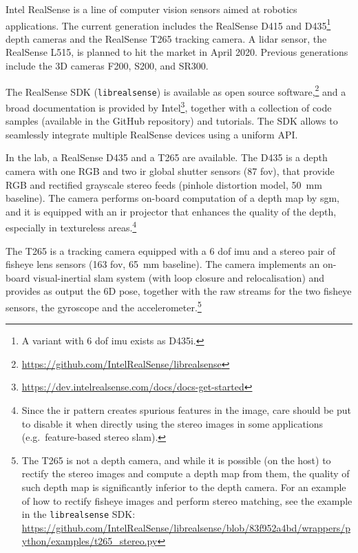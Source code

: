 \documentclass[11pt, letterpaper, twoside]{article}
\begin{document}
Intel RealSense is a line of computer vision sensors aimed at robotics
applications. The current generation includes the RealSense D415 and
D435\footnote{A variant with 6 \gls{dof} \gls{imu} exists as D435i.} depth
cameras and the RealSense T265 tracking camera. A lidar sensor, the RealSense
L515, is planned to hit the market in April 2020. Previous generations include
the 3D cameras F200, S200, and SR300.

The RealSense SDK (\texttt{librealsense}) is available as open source
software,\footnote{\url{https://github.com/IntelRealSense/librealsense}} and a
broad documentation is provided by
Intel\footnote{\url{https://dev.intelrealsense.com/docs/docs-get-started}},
together with a collection of code samples (available in the GitHub repository)
and tutorials. The SDK allows to seamlessly integrate multiple RealSense
devices using a uniform API.

In the lab, a RealSense D435 and a T265 are available. The D435 is a depth
camera with one RGB and two \gls{ir} global shutter sensors (87\textdegree{}
\gls{fov}), that provide RGB and rectified grayscale stereo feeds (pinhole
distortion model, 50~mm baseline). The camera performs on-board computation of a
depth map by \gls{sgm}, and it is equipped with an \gls{ir} projector that
enhances the quality of the depth, especially in textureless
areas.\footnote{Since the \gls{ir} pattern creates spurious features in the
    image, care should be put to disable it when directly using the stereo
    images in some applications (e.g.\ feature-based stereo \gls{slam}).}

The T265 is a tracking camera equipped with a 6 \gls{dof} \gls{imu} and a
stereo pair of fisheye lens sensors (163\textdegree{} \gls{fov}, 65~mm
baseline). The camera implements an on-board visual-inertial \gls{slam} system
(with loop closure and relocalisation) and provides as output the 6D pose,
together with the raw streams for the two fisheye sensors, the gyroscope and
the accelerometer.\footnote{The T265 is not a depth camera, and while it is
    possible (on the host) to rectify the stereo images and compute a depth map
    from them, the quality of such depth map is significantly inferior to the
    depth camera. For an example of how to rectify fisheye images and perform
    stereo matching, see the example in the \texttt{librealsense} SDK:
\url{https://github.com/IntelRealSense/librealsense/blob/83f952a4bd/wrappers/python/examples/t265_stereo.py}}
\end{document}
